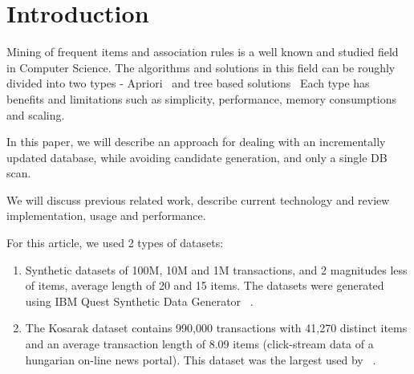 \section{Introduction}
Mining of frequent items and association rules is a well known and studied field in Computer Science. The algorithms and solutions in this field can be roughly divided into two types - Apriori~\cite{agrawal1994fast} and tree based solutions~\cite{tsay2009fiut,leung2005cantree,tanbeer2009efficient} Each type has benefits and limitations such as simplicity, performance, memory consumptions and scaling. 


In this paper, we will describe an approach for dealing with an incrementally updated database, while avoiding candidate generation, and only a single DB scan.

We will discuss previous related work, describe current technology and review implementation, usage and performance.

For this article, we used 2 types of datasets:
\begin{enumerate}
\item Synthetic datasets of 100M, 10M and 1M transactions, and 2 magnitudes less of items, average length of 20 and 15 items. The datasets were generated using IBM Quest Synthetic Data Generator ~\cite{agrawal1994quest}.
\item The Kosarak dataset contains 990,000 transactions with 41,270 distinct items and an average transaction length of 8.09 items (click-stream data of a hungarian on-line news portal). This dataset was the largest used by ~\cite{tanbeer2009efficient}.
\end{enumerate}

